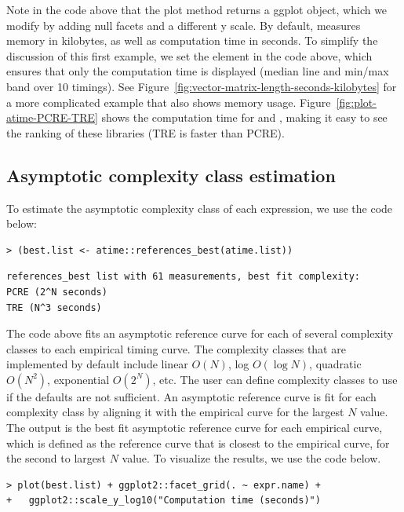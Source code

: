 Note in the code above that the plot method returns a ggplot object, which we modify by adding null facets and a different y scale.
By default,  measures memory in kilobytes, as well as computation time in seconds.
To simplify the discussion of this first example, we set the  element in the code above, which ensures that only the computation time is displayed (median line and min/max band over 10 timings).
See Figure~\ref{fig:vector-matrix-length-seconds-kilobytes} for a more complicated example that also shows memory usage.
Figure~\ref{fig:plot-atime-PCRE-TRE} shows the computation time for  and , making it easy to see the ranking of these libraries (TRE is faster than PCRE).
\subsection{Asymptotic complexity class estimation}

To estimate the asymptotic complexity class of each expression, we use the code below:
\begin{Schunk}
\begin{verbatim}
> (best.list <- atime::references_best(atime.list))
\end{verbatim}
\begin{verbatim}
references_best list with 61 measurements, best fit complexity:
PCRE (2^N seconds)
TRE (N^3 seconds)
\end{verbatim}
\end{Schunk}
The code above fits an asymptotic reference curve for each of several complexity classes to each empirical timing curve. 
The complexity classes that are implemented by default include linear $O(N)$, log $O(\log N)$, quadratic $O(N^2)$, exponential $O(2^N)$, etc.
The user can define complexity classes to use if the defaults are not sufficient. 
An asymptotic reference curve is fit for each complexity class by aligning it with the empirical curve for the largest $N$ value.  
The output is the best fit asymptotic reference curve for each empirical curve, which is defined as the reference curve that is closest to the empirical curve, for the second to largest $N$ value.
To visualize the results, we use the code below.
\begin{Schunk}
\begin{verbatim}
> plot(best.list) + ggplot2::facet_grid(. ~ expr.name) +
+   ggplot2::scale_y_log10("Computation time (seconds)")
\end{verbatim}
\end{Schunk}

